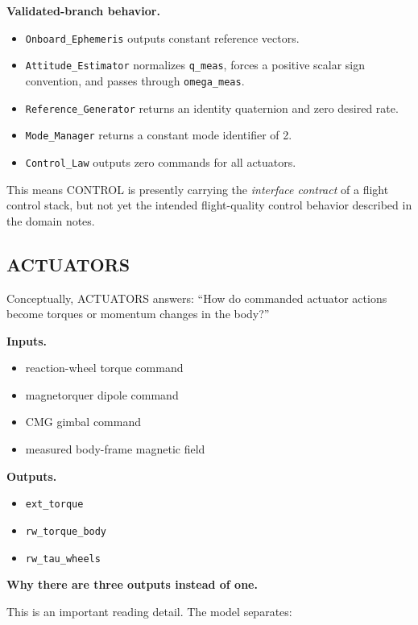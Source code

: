 \documentclass[11pt]{article}
\begin{document}
\textbf{Validated-branch behavior.}

\begin{itemize}
\item \texttt{Onboard\_Ephemeris} outputs constant reference vectors.
\item \texttt{Attitude\_Estimator} normalizes \texttt{q\_meas}, forces a positive scalar sign convention, and passes through \texttt{omega\_meas}.
\item \texttt{Reference\_Generator} returns an identity quaternion and zero desired rate.
\item \texttt{Mode\_Manager} returns a constant mode identifier of 2.
\item \texttt{Control\_Law} outputs zero commands for all actuators.
\end{itemize}

This means CONTROL is presently carrying the \emph{interface contract} of a flight control stack, but not yet the intended flight-quality control behavior described in the domain notes.

\subsection{ACTUATORS}

Conceptually, ACTUATORS answers: ``How do commanded actuator actions become torques or momentum changes in the body?''

\textbf{Inputs.}

\begin{itemize}
\item reaction-wheel torque command
\item magnetorquer dipole command
\item CMG gimbal command
\item measured body-frame magnetic field
\end{itemize}

\textbf{Outputs.}

\begin{itemize}
\item \texttt{ext\_torque}
\item \texttt{rw\_torque\_body}
\item \texttt{rw\_tau\_wheels}
\end{itemize}

\textbf{Why there are three outputs instead of one.}

This is an important reading detail. The model separates:
\end{document}
